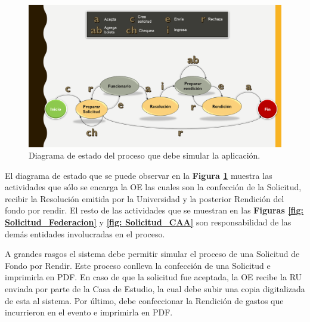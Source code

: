 \begin{figure}[h!tb]
    \hspace{-9mm}
    \includegraphics[width=1.1\textwidth]{Imagenes/Diagrama_de_estado.png}
    \caption{\label{fig: diagrama_estado}Diagrama de estado del proceso que debe simular la aplicación.}
\end{figure}

El diagrama de estado que se puede observar en la \textbf{Figura \ref{fig: diagrama_estado}} muestra las actividades que sólo se encarga la OE las cuales son la confección de la Solicitud, recibir la Resolución emitida por la Universidad y la posterior Rendición del fondo por rendir. El resto de las actividades que se muestran en las \textbf{Figuras \ref{fig: Solicitud_Federacion}} y \textbf{\ref{fig: Solicitud_CAA}} son responsabilidad de las demás entidades involucradas en el proceso. 

A grandes rasgos el sistema debe permitir simular el proceso de una Solicitud de Fondo por Rendir. Este proceso conlleva la confección de una Solicitud e imprimirla en PDF. En caso de que la solicitud fue aceptada, la OE recibe la RU enviada por parte de la Casa de Estudio, la cual debe subir una copia digitalizada de esta al sistema. Por último, debe confeccionar la Rendición de gastos que incurrieron en el evento e imprimirla en PDF.